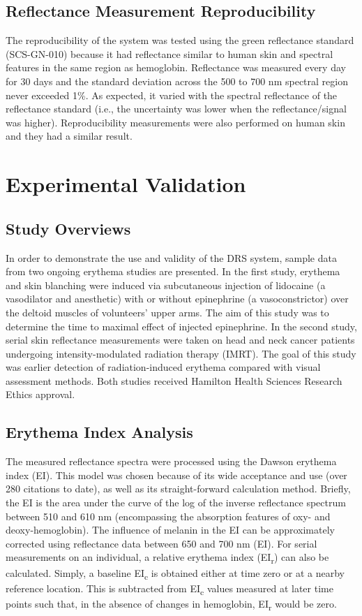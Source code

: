 \subsection{Reflectance Measurement Reproducibility}
The reproducibility of the system was tested using the green reflectance standard (SCS-GN-010) because it had reflectance similar to human skin and spectral features in the same region as hemoglobin. Reflectance was measured every day for 30 days and the standard deviation across the 500 to 700 nm spectral region never exceeded 1\%. As expected, it varied with the spectral reflectance of the reflectance standard (i.e., the uncertainty was lower when the reflectance/signal was higher). Reproducibility measurements were also performed on human skin and they had a similar result.

\section{Experimental Validation}

\subsection{Study Overviews}
In order to demonstrate the use and validity of the DRS system, sample data from two ongoing erythema studies are presented. In the first study, erythema and skin blanching were induced via subcutaneous injection of lidocaine (a vasodilator and anesthetic) with or without epinephrine (a vasoconstrictor) over the deltoid muscles of volunteers’ upper arms. The aim of this study was to determine the time to maximal effect of injected epinephrine. In the second study, serial skin reflectance measurements were taken on head and neck cancer patients undergoing intensity-modulated radiation therapy (IMRT). The goal of this study was earlier detection of radiation-induced erythema compared with visual assessment methods. Both studies received Hamilton Health Sciences Research Ethics approval.

\subsection{Erythema Index Analysis}
\label{sec:ei_analysis}
The measured reflectance spectra were processed using the Dawson erythema index (EI).\cite{Dawson1980} This model was chosen because of its wide acceptance and use (over 280 citations to date),\cite{Riordan2001} as well as its straight-forward calculation method. Briefly, the EI is the area under the curve of the log of the inverse reflectance spectrum between 510 and 610 nm (encompassing the absorption features of oxy- and deoxy-hemoglobin). The influence of melanin in the EI can be approximately corrected using reflectance data between 650 and 700 nm (EI). For serial measurements on an individual, a relative erythema index (EI\textsubscript{r}) can also be calculated. Simply, a baseline EI\textsubscript{c} is obtained either at time zero or at a nearby reference location. This is subtracted from EI\textsubscript{c} values measured at later time points such that, in the absence of changes in hemoglobin, EI\textsubscript{r} would be zero.

